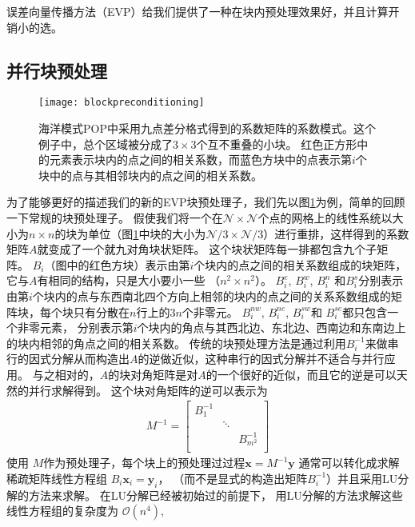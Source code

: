 误差向量传播方法（EVP）给我们提供了一种在块内预处理效果好，并且计算开销小的选。 




\subsection{并行块预处理} 
\label{precond:EVP:Parallel}
 
\begin{figure}
\centering
\texttt{[image: blockpreconditioning]}
\caption[] {海洋模式POP中采用九点差分格式得到的系数矩阵的系数模式。这个例子中，总个区域被分成了$3\times3$个互不重叠的小块。
红色正方形中的元素表示块内的点之间的相关系数，而蓝色方块中的点表示第$i$个块中的点与其相邻块内的点之间的相关系数。 \label{fig:blockprecond}}
\end{figure}
 
为了能够更好的描述我们的新的EVP块预处理子，我们先以图\ref{fig:blockprecond}为例，简单的回顾一下常规的块预处理子。 
假使我们将一个在$\mathcal{N} \times \mathcal{N}$个点的网格上的线性系统以大小为$n\times n$的块为单位（图\ref{fig:blockprecond}中块的大小为$\mathcal{N}/3\times \mathcal{N}/3$）进行重排，这样得到的系数矩阵$A$就变成了一个就九对角块状矩阵。
这个块状矩阵每一排都包含九个子矩阵。 
$B_i$（图中的红色方块）表示由第$i$个块内的点之间的相关系数组成的块矩阵，它与$A$有相同的结构，只是大小要小一些 （$n^2\times n^2$）。 
$B_i^e$, $B_i^w$, $B_i^n$ 和$B_i^s$分别表示由第$i$个块内的点与东西南北四个方向上相邻的块内的点之间的关系系数组成的矩阵块，每个块只有分散在$n$行上的$3n$个非零元。
$B_i^{nw}$, $B_i^{ne}$, $B_i^{sw}$和 $B_i^{se}$都只包含一个非零元素， 分别表示第$i$个块内的角点与其西北边、东北边、西南边和东南边上的块内相邻的角点之间的相关系数。 
传统的块预处理方法是通过利用$B_i^{-1}$来做串行的因式分解从而构造出$A$的逆做近似，这种串行的因式分解并不适合与并行应用。
与之相对的，$A$的块对角矩阵是对$A$的一个很好的近似，而且它的逆是可以天然的并行求解得到。
这个块对角矩阵的逆可以表示为 
\begin{eqnarray*}
M^{-1}=    \left [
        \begin{array}{ccccccc}
        B_1^{-1} &   &  \\
         & \ddots&  \\
        &   &  B_{m^2}^{-1} \\
    \end{array}
    \right ]
\end{eqnarray*}
使用 $M$作为预处理子，每个块上的预处理过过程$\textbf{x}
= M^{-1}\textbf{y}$ 通常可以转化成求解稀疏矩阵线性方程组 $B_i \textbf{x}_i = \textbf{y}_i$，
（而不是显式的构造出矩阵$B_i^{-1}$）并且采用LU分解的方法来求解。  
在LU分解已经被初始过的前提下， 用LU分解的方法求解这些线性方程组的复杂度为 $\mathcal{O}(n^4)$,
 



